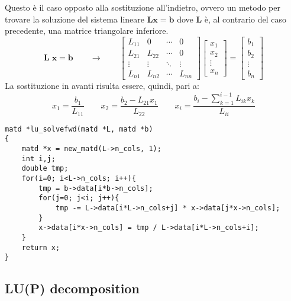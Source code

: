 \documentclass[10pt]{article}
\begin{document}
Questo è il caso opposto alla sostituzione all'indietro, ovvero un metodo per trovare la soluzione del sistema lineare $\mathbf{L}\mathbf{x}=\mathbf{b}$ dove $\mathbf{L}$ è, al contrario del caso precedente, una matrice triangolare inferiore.
\begin{equation}
\mathbf{L} \; \mathbf{x} = \mathbf{b}
\qquad \rightarrow \qquad
\begin{bmatrix}
L_{11} & 0      & \cdots & 0      \\
L_{21} & L_{22} & \cdots & 0      \\
\vdots & \vdots & \ddots & \vdots \\
L_{n1} & L_{n2} & \cdots & L_{nn}
\end{bmatrix}
\begin{bmatrix}
x_1 \\ x_2 \\ \vdots \\ x_n
\end{bmatrix} = 
\begin{bmatrix}
b_1 \\ b_2 \\ \vdots \\ b_n
\end{bmatrix}
\end{equation}
La sostituzione in avanti risulta essere, quindi, pari a:
\begin{equation}
x_1 = \frac{b_1}{L_{11}} \qquad
x_2 = \frac{b_2 - L_{21} x_1}{L_{22}} \qquad
x_i = \frac{b_i - \sum_{k=1}^{i-1} L_{ik} x_k}{L_{ii}}
\end{equation}

\begin{lstlisting}
matd *lu_solvefwd(matd *L, matd *b)
{
	matd *x = new_matd(L->n_cols, 1);
	int i,j;
	double tmp;
	for(i=0; i<L->n_cols; i++){
		tmp = b->data[i*b->n_cols];
		for(j=0; j<i; j++){
			tmp -= L->data[i*L->n_cols+j] * x->data[j*x->n_cols];
		}
		x->data[i*x->n_cols] = tmp / L->data[i*L->n_cols+i];
	}
	return x;
}
\end{lstlisting}


\subsection{LU(P) decomposition}
\end{document}
